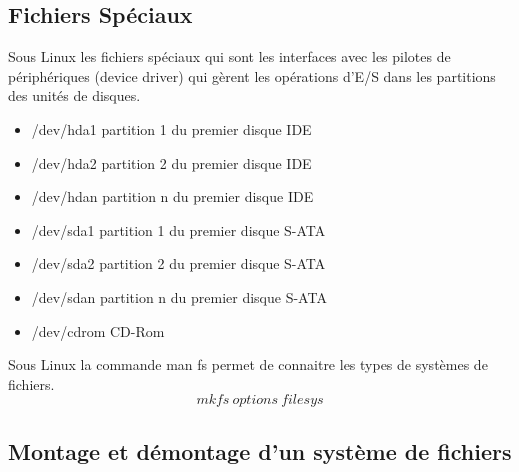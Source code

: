 \documentclass[12pt,a4paper,openany]{book}
\begin{document}
		\subsection{Fichiers Spéciaux}
			Sous Linux les fichiers spéciaux qui sont les interfaces avec les pilotes
			de périphériques (device driver) qui gèrent les opérations d'E/S dans les
			partitions des unités de disques. 
			\begin{itemize}
				\item /dev/hda1 partition 1 du premier disque IDE
				\item /dev/hda2 partition 2 du premier disque IDE
				\item /dev/hdan partition n du premier disque IDE

				\item /dev/sda1 partition 1 du premier disque S-ATA
				\item /dev/sda2 partition 2 du premier disque S-ATA
				\item /dev/sdan partition n du premier disque S-ATA
				\item /dev/cdrom CD-Rom
			\end{itemize}		
		Sous Linux la commande man fs permet de connaitre les types de systèmes
		de fichiers.
		$$mkfs~options~filesys$$
		\subsection{Montage et démontage d'un système de fichiers}

 
\end{document}
